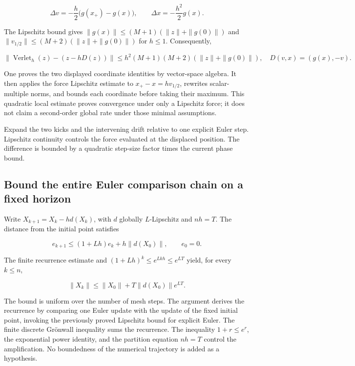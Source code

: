 \documentclass[11pt,a4paper]{report}
\begin{document}
\[\Delta v=-\frac h2\bigl(g(x_+)-g(x)\bigr),\qquad\Delta x=-\frac{h^2}{2}g(x).\]

The Lipschitz bound gives \(\|g(x)\|\le(M+1)(\|z\|+\|g(0)\|)\) and \(\|v_{1/2}\|\le(M+2)(\|z\|+\|g(0)\|)\) for \(h\le1\). Consequently,

\[\|\operatorname{Verlet}_h(z)-(z-hD(z))\|\le h^2(M+1)(M+2)(\|z\|+\|g(0)\|),\quad D(v,x)=(g(x),-v).\]

One proves the two displayed coordinate identities by vector-space algebra. It then applies the force Lipschitz estimate to \(x_+-x=hv_{1/2}\), rewrites scalar-multiple norms, and bounds each coordinate before taking their maximum. This quadratic local estimate proves convergence under only a Lipschitz force; it does not claim a second-order global rate under those minimal assumptions.



Expand the two kicks and the intervening drift relative to one explicit Euler step. Lipschitz continuity controls the force evaluated at the displaced position. The difference is bounded by a quadratic step-size factor times the current phase bound.

\subsection{\texorpdfstring{Bound the entire Euler comparison chain on a fixed horizon}{Bound the entire Euler comparison chain on a fixed horizon}}
\label{report-step-KineticLangevin-HamiltonianConvergence-lean-3}


Write \(X_{k+1}=X_k-hd(X_k)\), with \(d\) globally \(L\)-Lipschitz and \(nh=T\). The distance from the initial point satisfies

\[e_{k+1}\le(1+Lh)e_k+h\|d(X_0)\|,\qquad e_0=0.\]

The finite recurrence estimate and \((1+Lh)^k\le e^{Lkh}\le e^{LT}\) yield, for every \(k\le n\),

\[\|X_k\|\le\|X_0\|+T\|d(X_0)\|e^{LT}.\]

The bound is uniform over the number of mesh steps. The argument derives the recurrence by comparing one Euler update with the update of the fixed initial point, invoking the previously proved Lipschitz bound for explicit Euler. The finite discrete Grönwall inequality sums the recurrence. The inequality \(1+r\le e^r\), the exponential power identity, and the partition equation \(nh=T\) control the amplification. No boundedness of the numerical trajectory is added as a hypothesis.
\end{document}

